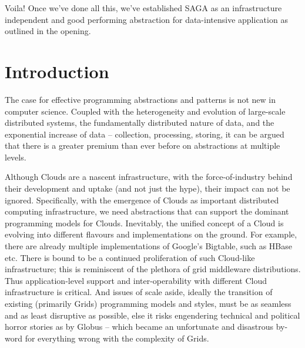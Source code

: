 \documentclass[conference,final]{IEEEtran}
\begin{document}
{Voila! Once we've done all this, we've established SAGA as an
infrastructure independent and good performing abstraction for
data-intensive application as outlined in the opening.}

\section{Introduction} 

The case for effective programming abstractions and patterns is not
new in computer science.  Coupled with the heterogeneity and evolution
of large-scale distributed systems, the fundamentally distributed
nature of data, and the exponential increase of data -- collection,
processing, storing, it can be argued that there is a greater premium
than ever before on abstractions at multiple levels.


Although Clouds are a nascent infrastructure, with the
force-of-industry behind their development and uptake (and not just
the hype), their impact can not be ignored.  Specifically, with the
emergence of Clouds as important distributed computing infrastructure,
we need abstractions that can support the dominant programming models
for Clouds. Inevitably, the unified concept of a Cloud is evolving
into different flavours and implementations on the ground. For
example, there are already multiple implementations of Google's
Bigtable, such as HBase etc. There is bound to be a continued
proliferation of such Cloud-like infrastructure; this is reminiscent
of the plethora of grid middleware distributions. Thus
application-level support and inter-operability with different Cloud
infrastructure is critical. And issues of scale aside, ideally the
transition of existing (primarily Grids) programming models and
styles, must be as seamless and as least disruptive as possible, else
it risks engendering technical and political horror stories as by
Globus -- which became an unfortunate and disastrous by-word for
everything wrong with the complexity of Grids.
\end{document}
